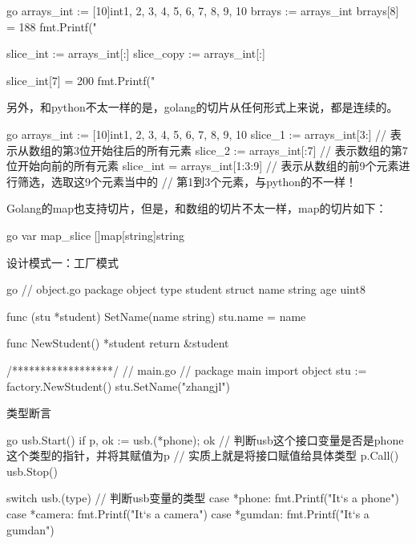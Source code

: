 \begin{outline}[enumerate]
\begin{code-in-enumerate}{go}
arrays_int := [10]int{1, 2, 3, 4, 5, 6, 7, 8, 9, 10}
brrays := arrays_int
brrays[8] = 188
fmt.Printf("%

slice_int := arrays_int[:]
slice_copy := arrays_int[:]

slice_int[7] = 200
fmt.Printf("%
\end{code-in-enumerate}

  另外，和python不太一样的是，golang的切片从任何形式上来说，都是连续的。
\begin{code-in-enumerate}{go}
arrays_int := [10]int{1, 2, 3, 4, 5, 6, 7, 8, 9, 10}
slice_1 := arrays_int[3:] // 表示从数组的第3位开始往后的所有元素
slice_2 := arrays_int[:7] // 表示数组的第7位开始向前的所有元素
slice_int = arrays_int[1:3:9] // 表示从数组的前9个元素进行筛选，选取这9个元素当中的
                              // 第1到3个元素，与python的不一样！
\end{code-in-enumerate}

  Golang的map也支持切片，但是，和数组的切片不太一样，map的切片如下：
\begin{code-in-enumerate}{go}
var map_slice []map[string]string
\end{code-in-enumerate}

  \1 设计模式一：工厂模式

\begin{code-in-enumerate}{go}
// object.go
package object
type student struct {
    name string
    age  uint8
}

func (stu *student) SetName(name string) {
    stu.name = name
}

func NewStudent() *student {
    return &student{}
}

/******************/
// main.go
// package main
import object
stu := factory.NewStudent()
stu.SetName("zhangjl")
\end{code-in-enumerate}

  \1 类型断言

\begin{code-in-enumerate}{go}
usb.Start()
if p, ok := usb.(*phone); ok { // 判断usb这个接口变量是否是phone这个类型的指针，并将其赋值为p
                               // 实质上就是将接口赋值给具体类型
    p.Call()
}
usb.Stop()

switch usb.(type) { // 判断usb变量的类型
case *phone:
    fmt.Printf("It`s a phone\n")
case *camera:
    fmt.Printf("It`s a camera\n")
case *gumdan:
    fmt.Printf("It`s a gumdan\n")
}
\end{code-in-enumerate}


\end{outline}

